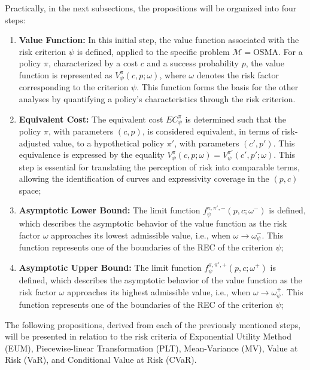 \documentclass[runningheads]{llncs}
\begin{document}
Practically, in the next subsections, the propositions will be organized into four steps:
\begin{enumerate}
    \item \textbf{Value Function:} In this initial step, the value function associated with the risk criterion $ \psi $ is defined, applied to the specific problem $ \mathcal{M} = \text{OSMA} $. For a policy $ \pi $, characterized by a cost $ c $ and a success probability $ p $, the value function is represented as $ V^{\pi}_{\psi}(c,p;\omega) $, where $ \omega $ denotes the risk factor corresponding to the criterion $ \psi $. This function forms the basis for the other analyses by quantifying a policy's characteristics through the risk criterion.
    
    \item \textbf{Equivalent Cost:} The equivalent cost $ EC_{\psi}^{\pi} $ is determined such that the policy $ \pi $, with parameters $ (c, p) $, is considered equivalent, in terms of risk-adjusted value, to a hypothetical policy $ \pi' $, with parameters $ (c', p') $. This equivalence is expressed by the equality $ V^{\pi}_{\psi}(c,p;\omega) = V^{\pi'}_{\psi}(c',p';\omega) $. This step is essential for translating the perception of risk into comparable terms, allowing the identification of curves and expressivity coverage in the $ (p, c) $ space;
    
    \item \textbf{Asymptotic Lower Bound:} The limit function $ f_{\psi}^{\pi, \pi', -}(p,c;\omega^{-}) $ is defined, which describes the asymptotic behavior of the value function as the risk factor $ \omega $ approaches its lowest admissible value, i.e., when $ \omega \to \omega^{-}_{\psi} $. This function represents one of the boundaries of the REC of the criterion $ \psi $;
    
    \item \textbf{Asymptotic Upper Bound:} The limit function $ f_{\psi}^{\pi, \pi', +}(p,c;\omega^{+}) $ is defined, which describes the asymptotic behavior of the value function as the risk factor $ \omega $ approaches its highest admissible value, i.e., when $ \omega \to \omega^{+}_{\psi} $. This function represents one of the boundaries of the REC of the criterion $ \psi $;
\end{enumerate}

The following propositions, derived from each of the previously mentioned steps, will be presented in relation to the risk criteria of Exponential Utility Method (EUM), Piecewise-linear Transformation (PLT), Mean-Variance (MV), Value at Risk (VaR), and Conditional Value at Risk (CVaR).
\end{document}

